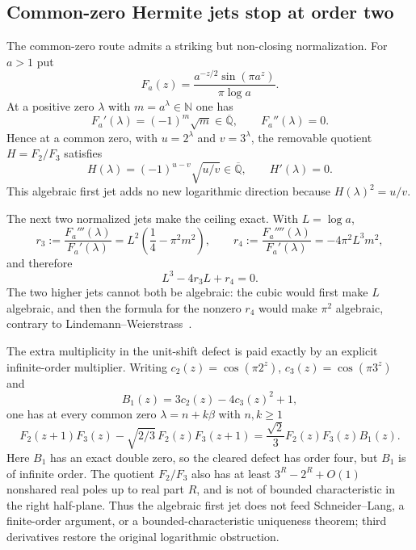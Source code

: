 \documentclass[11pt,oneside]{article}
\theoremstyle{definition}
\theoremstyle{remark}
\newcommand{\N}{\mathbb N}
\newcommand{\Abar}{\overline{\mathbb Q}}
\newcommand{\Qbar}{\Abar}
\begin{document}
\subsection{Common-zero Hermite jets stop at order two}
\label{crit:hermite}

The common-zero route admits a striking but non-closing normalization.  For $a>1$ put
\begin{equation}
 F_a(z)=\frac{a^{-z/2}\sin(\pi a^z)}{\pi\log a}.
 \label{crit:eq-half-density}
\end{equation}
At a positive zero $\lambda$ with $m=a^\lambda\in\N$ one has
\begin{equation}
 F_a'(\lambda)=(-1)^m\sqrt m\in\Qbar,
 \qquad F_a''(\lambda)=0.
 \label{crit:eq-algebraic-jet}
\end{equation}
Hence at a common zero, with $u=2^\lambda$ and $v=3^\lambda$, the removable quotient
$H=F_2/F_3$ satisfies
\[
 H(\lambda)=(-1)^{u-v}\sqrt{u/v}\in\Qbar,
 \qquad H'(\lambda)=0.
\]
This algebraic first jet adds no new logarithmic direction because $H(\lambda)^2=u/v$.

The next two normalized jets make the ceiling exact.  With $L=\log a$,
\begin{equation}
 r_3:=\frac{F_a'''(\lambda)}{F_a'(\lambda)}
 =L^2\left(\frac14-\pi^2m^2\right),\qquad
 r_4:=\frac{F_a''''(\lambda)}{F_a'(\lambda)}=-4\pi^2L^3m^2,
 \label{crit:eq-higher-jets}
\end{equation}
and therefore
\begin{equation}
 L^3-4r_3L+r_4=0.
 \label{crit:eq-jet-cubic}
\end{equation}
The two higher jets cannot both be algebraic: the cubic would first make $L$ algebraic, and
then the formula for the nonzero $r_4$ would make $\pi^2$ algebraic, contrary to
Lindemann--Weierstrass~\cite{Baker1975}.

The extra multiplicity in the unit-shift defect is paid exactly by an explicit
infinite-order multiplier.  Writing $c_2(z)=\cos(\pi2^z)$,
$c_3(z)=\cos(\pi3^z)$ and
\[
 B_1(z)=3c_2(z)-4c_3(z)^2+1,
\]
one has at every common zero $\lambda=n+k\beta$ with $n,k\ge1$
\begin{equation}
 F_2(z+1)F_3(z)-\sqrt{2/3}\,F_2(z)F_3(z+1)
 =\frac{\sqrt2}{3}F_2(z)F_3(z)B_1(z).
 \label{crit:eq-hermite-defect}
\end{equation}
Here $B_1$ has an exact double zero, so the cleared defect has order four, but $B_1$ is of
infinite order.  The quotient $F_2/F_3$ also has at least $3^R-2^R+O(1)$ nonshared real poles
up to real part $R$, and is not of bounded characteristic in the right half-plane.  Thus the algebraic first jet does
not feed Schneider--Lang, a finite-order argument, or a bounded-characteristic uniqueness
theorem; third derivatives restore the original logarithmic obstruction.
\end{document}
